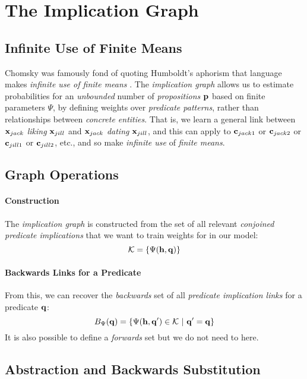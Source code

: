 \documentclass[11pt]{article}
\newcommand{\xvariable}{{\bf x}}
\newcommand{\cvariable}{{\bf c}}
\newcommand{\pvariable}{{\bf p}}
\newcommand{\qvariable}{{\bf q}}
\newcommand{\hvariable}{{\bf h}}
\newcommand{\condsep}{\ |\ }
\newcommand{\xjack}{\xvariable_{jack}}
\newcommand{\xjill}{\xvariable_{jill}}
\begin{document}
\section{The Implication Graph}
\label{s:predgraph}
\subsection{Infinite Use of Finite Means}
Chomsky was famously fond of quoting Humboldt's aphorism that language makes {\em infinite use of finite means} \cite{Chomsky1965Aspects}.
The {\em implication graph} allows us to estimate probabilities for an {\em unbounded} number of {\em propositions} $\pvariable$ based on finite parameters $\Psi$, by defining weights over {\em predicate patterns}, rather than relationships between {\em concrete entities}.
That is, we learn a general link between $\xjack$ {\em liking} $\xjill$ and $\xjack$ {\em dating} $\xjill$, and this can apply to $\cvariable_{jack1}$ or $\cvariable_{jack2}$ or $\cvariable_{jill1}$ or $\cvariable_{jill2}$, etc., and so make {\em infinite use} of {\em finite means}.

\subsection{Graph Operations}
\paragraph{Construction}
The {\em implication graph} is constructed from the set of all relevant {\em conjoined predicate implications} that we want to train weights for in our model:
\begin{equation}
    \mathcal{K} = \left\{\Psi(\hvariable, \qvariable)\right\}
\end{equation}

\paragraph{Backwards Links for a Predicate}
From this, we can recover the {\em backwards} set of all {\em predicate implication links} for a predicate $\qvariable$:
\begin{equation}
    B_\Psi(\qvariable) = \left\{\Psi(\hvariable, \qvariable') \in \mathcal{K}  \condsep \qvariable' = \qvariable \right\}
\end{equation}
It is also possible to define a {\em forwards} set but we do not need to here.

\subsection{Abstraction and Backwards Substitution}
\end{document}
